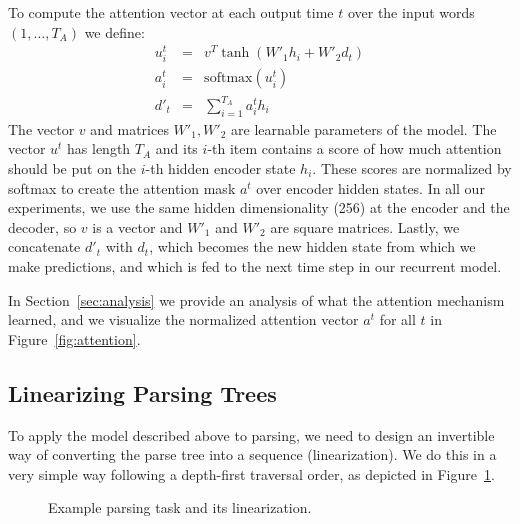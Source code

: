 \documentclass{article} \usepackage{nips15submit_e,times}
\begin{document}
To compute the attention vector at each output time $t$ over the input
words $(1,\ldots,T_A)$ we define:
\begin{eqnarray*}
u^t_i &=& v^T \tanh (W'_1 h_i + W'_2 d_t)\\
a^t_i &=& \mathrm{softmax}(u^t_i) \label{eqn:attn}\\
d'_t &=& \sum_{i=1}^{T_A} a^t_i  h_i
\end{eqnarray*}
The vector $v$ and matrices $W'_1, W'_2$ are learnable parameters of the model.
The vector $u^t$ has length $T_A$ and its $i$-th item contains a score of
how much attention should be put on the $i$-th hidden encoder state $h_i$.
These scores are normalized by softmax to create the attention mask $a^t$ over
encoder hidden states.
In all our experiments, we use the same hidden dimensionality (256) at
the encoder and the decoder, so $v$ is a vector and $W'_1$ and $W'_2$ are
square matrices. Lastly, we concatenate $d'_t$ with $d_t$, which becomes
the new hidden state from which we make predictions, and which is fed to
the next time step in our recurrent model.

In Section~\ref{sec:analysis} we provide an analysis of what the attention
mechanism learned, and we visualize the normalized attention vector $a^t$ for
all $t$ in Figure~\ref{fig:attention}.

\subsection{Linearizing Parsing Trees}

To apply the model described above to parsing, we need to design an
invertible way of converting the parse tree into a sequence (linearization).
We do this in a very simple way following a depth-first
traversal order, as depicted in Figure~\ref{fig:task-example}.

\begin{figure}
  \begin{center}
  \end{center}
  \caption{Example parsing task and its linearization.}
  \label{fig:task-example}
\end{figure}
\end{document}
